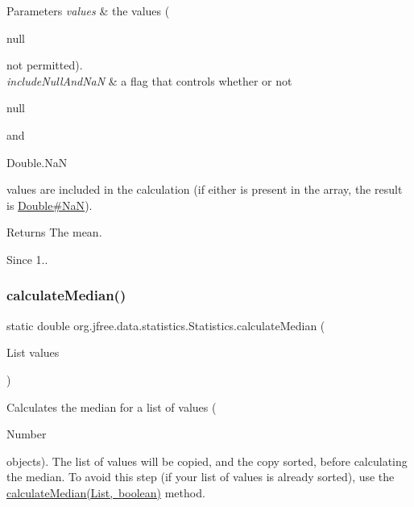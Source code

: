 \begin{DoxyParams}{Parameters}
{\em values} & the values (
\begin{DoxyCode}
null 
\end{DoxyCode}
 not permitted). \\
\hline
{\em include\+Null\+And\+NaN} & a flag that controls whether or not 
\begin{DoxyCode}
null 
\end{DoxyCode}
 and
\begin{DoxyCode}
Double.NaN 
\end{DoxyCode}
 values are included in the calculation (if either is present in the array, the result is \mbox{\hyperlink{}{Double\#\+NaN}}).\\
\hline
\end{DoxyParams}
\begin{DoxyReturn}{Returns}
The mean.
\end{DoxyReturn}
\begin{DoxySince}{Since}
1.. 
\end{DoxySince}
\mbox{\label{classorg_1_1jfree_1_1data_1_1statistics_1_1_statistics_a83928ff9ff68a235326afd8fbdcab73d}} 
\subsubsection{\texorpdfstring{calculate\+Median()}{calculateMedian()}\hspace{0.1cm}{\footnotesize\ttfamily [1/4]}}
{\footnotesize\ttfamily static double org.\+jfree.\+data.\+statistics.\+Statistics.\+calculate\+Median (\begin{DoxyParamCaption}\item[{List}]{values }\end{DoxyParamCaption})\hspace{0.3cm}{\ttfamily [static]}}

Calculates the median for a list of values (
\begin{DoxyCode}
Number 
\end{DoxyCode}
 objects). The list of values will be copied, and the copy sorted, before calculating the median. To avoid this step (if your list of values is already sorted), use the \mbox{\hyperlink{classorg_1_1jfree_1_1data_1_1statistics_1_1_statistics_a473dcad23f5bb87f704c62562554c89b}{calculate\+Median(\+List, boolean)}} method.


